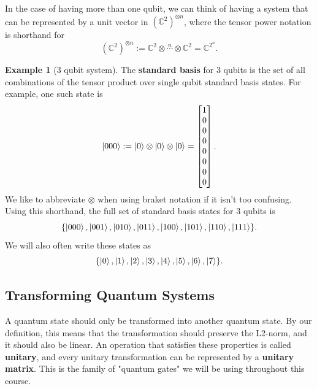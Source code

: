\documentclass[letterpaper, 12pt]{article}
\newcommand{\C}{\mathbb{C}}	%
\newcommand{\1}{\mathds{1}}	%
\theoremstyle{definition}
\newtheorem{example}[theorem]{Example}
\begin{document}
In the case of having more than one qubit, we can think of having a system that can be represented by a unit vector in $(\C^2)^{\otimes n}$, where the tensor power notation is shorthand for 
\begin{equation}
    (\C^2)^{\otimes n} := \C^2 \otimes \overset{n}{\cdots} \otimes \C^2 = \C^{2^n}.
\end{equation}

\begin{example}[3 qubit system]
    The \textbf{standard basis} for 3 qubits is the set of all combinations of the tensor product over single qubit standard basis states. For example, one such state is 
    \begin{equation}
        \ket{000} := \ket{0} \otimes \ket{0} \otimes \ket{0} = \begin{bmatrix}
            1 \\ 0 \\ 0 \\ 0 \\ 0 \\ 0 \\ 0 \\ 0
        \end{bmatrix}.
    \end{equation}
    We like to abbreviate $\otimes$ when using braket notation if it isn't too confusing. Using this shorthand, the full set of standard basis states for 3 qubits is 
    \begin{equation}
        \{\ket{000}, \ket{001}, \ket{010}, \ket{011}, \ket{100}, \ket{101}, \ket{110}, \ket{111}\}.
    \end{equation}
    We will also often write these states as 
    \begin{equation}
        \{\ket{0}, \ket{1}, \ket{2}, \ket{3}, \ket{4}, \ket{5}, \ket{6}, \ket{7}\}.
    \end{equation}
\end{example}

\newpage 
\subsection{Transforming Quantum Systems}

A quantum state should only be transformed into another quantum state. By our definition, this means that the transformation should preserve the L2-norm, and it should also be linear. An operation that satisfies these properties is called \textbf{unitary}, and every unitary transformation can be represented by a \textbf{unitary matrix}. This is the family of "quantum gates" we will be using throughout this course. 
\end{document}
